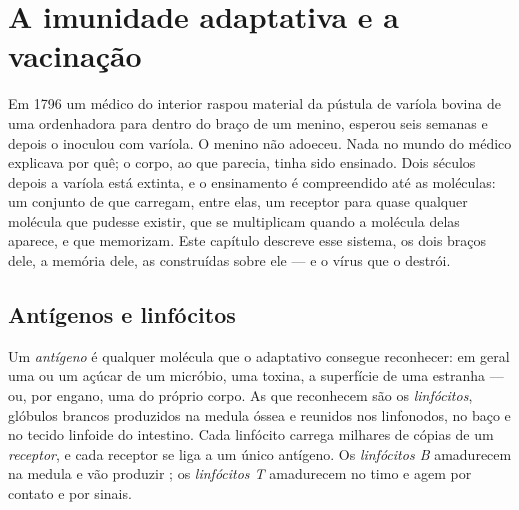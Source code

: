 \chapter{A imunidade adaptativa e a vacinação}\label{ch:g12:adaptive-immunity}

Em 1796 um médico do interior raspou material da pústula de varíola
bovina de uma ordenhadora para dentro do braço de um menino, esperou
seis semanas e depois o inoculou com varíola. O menino não adoeceu.
Nada no mundo do médico explicava por quê; o corpo, ao que parecia,
tinha sido ensinado. Dois séculos depois a varíola está extinta, e o
ensinamento é compreendido até as moléculas: um conjunto de  que
carregam, entre elas, um receptor para quase qualquer molécula que
pudesse existir, que se multiplicam quando a molécula delas aparece, e
que memorizam. Este capítulo descreve esse sistema, os dois braços
dele, a memória dele, as  construídas sobre ele --- e o vírus
que o destrói.

\section{Antígenos e linfócitos}

\begin{definition}\label{def:g12:adaptive-immunity:antigen}
Um \emph{antígeno} é qualquer molécula que o  adaptativo consegue reconhecer: em geral uma  ou um
açúcar de um micróbio, uma toxina, a superfície de uma  estranha
--- ou, por engano, uma do próprio corpo. As  que reconhecem são
os \emph{linfócitos}, glóbulos brancos produzidos na
medula óssea e reunidos nos linfonodos, no baço e no tecido linfoide do
intestino. Cada linfócito carrega milhares de cópias de um
\emph{receptor}, e cada receptor se liga a um único antígeno. Os
\emph{linfócitos B} amadurecem na medula e vão produzir ; os
\emph{linfócitos T} amadurecem no timo e agem por contato e por sinais.
\end{definition}


